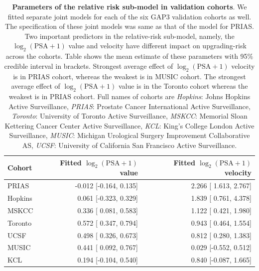 \begin{table}
\small\sf\centering
\caption{\textbf{Parameters of the relative risk sub-model in validation cohorts}. We fitted separate joint models for each of the six GAP3 validation cohorts as well. The specification of these joint models was same as that of the model for PRIAS. Two important predictors in the relative-risk sub-model, namely, the $\log_2 (\mbox{PSA} + 1)$ value and velocity have different impact on upgrading-risk across the cohorts. Table shows the mean estimate of these parameters with 95\% credible interval in brackets. Strongest average effect of $\log_2 (\mbox{PSA} + 1)$ velocity is in PRIAS cohort, whereas the weakest is in MUSIC cohort. The strongest average effect of $\log_2 (\mbox{PSA} + 1)$ value is in the Toronto cohort whereas the weakest is in PRIAS cohort. Full names of cohorts are \textit{Hopkins}: Johns Hopkins Active Surveillance, \textit{PRIAS}: Prostate Cancer International Active Surveillance, \textit{Toronto}: University of Toronto Active Surveillance, \textit{MSKCC}: Memorial Sloan Kettering Cancer Center Active Surveillance, \textit{KCL}: King's College London Active Surveillance, \textit{MUSIC}: Michigan Urological Surgery Improvement Collaborative AS, \textit{UCSF}: University of California San Francisco Active Surveillance.}
\label{tab:PSA_survival_gap3}
\begin{tabular}{lrr}
\hline
Cohort & Fitted $\log_2 (\mbox{PSA} + 1)$ value & Fitted $\log_2 (\mbox{PSA} + 1)$ velocity\\
\hline
PRIAS & -0.012 [-0.164, 0.135] & 2.266 [ 1.613, 2.767]\\
Hopkins & 0.061 [-0.323, 0.329] & 1.839 [ 0.761, 4.378]\\
MSKCC & 0.336 [ 0.081, 0.583] & 1.122 [ 0.421, 1.980]\\
Toronto & 0.572 [ 0.347, 0.794] & 0.943 [ 0.464, 1.554]\\
UCSF & 0.498 [ 0.326, 0.673] & 0.812 [ 0.280, 1.383]\\
MUSIC & 0.441 [ 0.092, 0.767] & 0.029 [-0.552, 0.512]\\
KCL &  0.194 [-0.104, 0.540] & 0.840 [-0.087, 1.665]\\
\hline
\end{tabular}
\end{table}